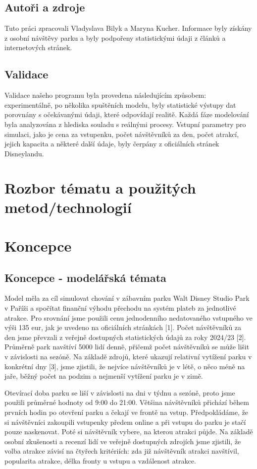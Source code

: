 \documentclass[a4paper,12pt]{article}
\begin{document}
\subsection{Autoři a zdroje}
Tuto práci zpracovali Vladyslava Bilyk a Maryna Kucher. Informace byly získány z osobní návštěvy parku a byly podpořeny statistickými údaji z článků a internetových stránek.

\subsection{Validace}
Validace našeho programu byla provedena následujícím způsobem: experimentálně, po několika spuštěních modelu, byly statistické výstupy dat porovnány s očekávanými údaji, které odpovídají realitě. Každá fáze modelování byla analyzována z hlediska souladu s reálnými procesy. Vstupní parametry pro simulaci, jako je cena za vstupenku, počet návštěvníků za den, počet atrakcí, jejich kapacita a některé další údaje, byly čerpány z oficiálních stránek Disneylandu.

\section{Rozbor tématu a použitých metod/technologií}

\section{Koncepce}
\subsection{Koncepce - modelářská témata}
Model měla za cíl simulovat chování v zábavním parku Walt Disney Studio Park v Paříži a spočítat finanční výhodu přechodu na systém plateb za jednotlivé atrakce. Pro srovnání jsme použili cenu jednodenního nedatovaného vstupného ve výši 135 eur, jak je uvedeno na oficiálních stránkách [1]. Počet návštěvníků za den jsme převzali z veřejně dostupných statistických údajů za roky 2024/23 [2]. Průměrně park navštíví 5000 lidí denně, přičemž počet návštěvníků se může lišit v závislosti na sezóně. Na základě zdrojů, které ukazují relativní vytížení parku v konkrétní dny [3], jsme zjistili, že nejvíce návštěvníků je v létě, o něco méně na jaře, běžný počet na podzim a nejmenší vytížení parku je v zimě.

Otevírací doba parku se liší v závislosti na dni v týdnu a sezóně, proto jsme použili průměrné hodnoty od 9:00 do 21:00. Většina návštěvníků přichází během prvních hodin po otevření parku a čekají ve frontě na vstup. Předpokládáme, že si návštěvníci zakoupili vstupenky předem online a při vstupu do parku je stačí pouze naskenovat. Poté si návštěvník vybere, na kterou atrakci půjde. Na základě osobní zkušenosti a recenzí lidí ve veřejně dostupných zdrojích jsme zjistili, že volba atrakce závisí na čtyřech kritériích: zda již návštěvník atrakci navštívil, popularita atrakce, délka fronty u vstupu a vzdálenost atrakce.
\end{document}
